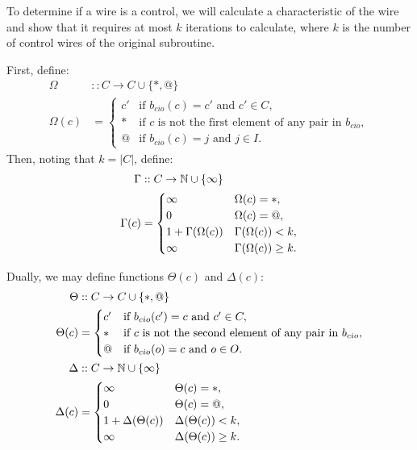 To determine if a wire is a control, we will calculate a characteristic of the wire and show that
it requires at most $k$ iterations to calculate, where $k$ is the number of control wires of the
original subroutine.

First, define:
\begin{align*}
  \Omega &:: C \to C \cup \{*,@\}\\
  \Omega(c) &=
  \begin{cases}
    c'&\text{if }b_{cio}(c) = c'\text{ and }c'\in C,\\
    *&\text{if $c$ is not the first element of any pair in }b_{cio},\\
    @&\text{if }b_{cio}(c) = j\text{ and }j\in I.
  \end{cases}
\end{align*}
Then, noting that $k = |C|$, define:
\begin{align*}
  \Gamma &:: C \to \mathbb{N} \cup \{\infty\}\\
  \Gamma(c) &=
  \begin{cases}
    \infty & \Omega(c) = *,\\
    0 & \Omega(c) = @,\\
    1 + \Gamma(\Omega(c)) & \Gamma(\Omega(c)) < k,\\
    \infty & \Gamma(\Omega(c)) \ge k.
  \end{cases}
\end{align*}

Dually, we may define functions  $\Theta(c)$ and $\Delta(c)$:
\begin{align*}
  \Theta &:: C \to C \cup \{*,@\}\\
  \Theta(c) &=
  \begin{cases}
    c'&\text{if }b_{cio}(c') = c\text{ and }c'\in C,\\
    *&\text{if $c$ is not the second element of any pair in }b_{cio},\\
    @&\text{if }b_{cio}(o) = c\text{ and }o\in O.
  \end{cases}\\
  \Delta &:: C \to \mathbb{N} \cup \{\infty\}\\
  \Delta(c) &=
  \begin{cases}
    \infty & \Theta(c) = *,\\
    0 & \Theta(c) = @,\\
    1 + \Delta(\Theta(c)) & \Delta(\Theta(c)) < k,\\
    \infty & \Delta(\Theta(c)) \ge k.
  \end{cases}
\end{align*}

